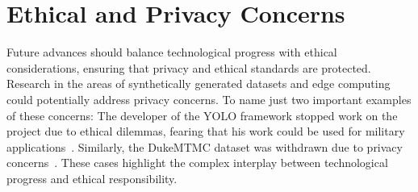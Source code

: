 \section{Ethical and Privacy Concerns}\label{sec:ethical_and_privacy_concerns}
Future advances should balance technological progress with ethical considerations, ensuring that privacy and ethical standards are protected. Research in the areas of synthetically generated datasets and edge computing could potentially address privacy concerns. To name just two important examples of these concerns: The developer of the YOLO framework stopped work on the project due to ethical dilemmas, fearing that his work could be used for military applications~\cite{Synced20}. Similarly, the DukeMTMC dataset was withdrawn due to privacy concerns~\cite{Harvey21}. These cases highlight the complex interplay between technological progress and ethical responsibility.